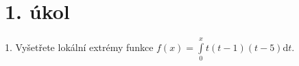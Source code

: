 \section{1. úkol}
  1. Vyšetřete lokální extrémy funkce $f(x) = \int\limits_0^x t(t-1)(t-5)\mathrm{d}t$.
